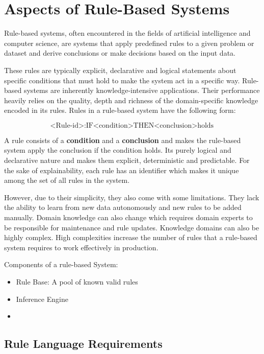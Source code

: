 \chapter{Aspects of Rule-Based Systems}\label{ch:aspects-of-rule-based-systems}

Rule-based systems, often encountered in the fields of artificial intelligence and computer science,
are systems that apply predefined rules to a given problem or dataset
and derive conclusions or make decisions based on the input data\cite{grosan2011rule}.

These rules are typically explicit, declarative and logical statements about specific conditions that must hold to make the system act in a specific way.
Rule-based systems are inherently knowledge-intensive applications\cite{hayes1985rule}.
Their performance heavily relies on the quality, depth and richness of the domain-specific knowledge encoded in its rules.
Rules in a rule-based system have the following form:

\[
    \text{<Rule-id>}: \text{IF} \text{<condition>} \text{THEN} \text{<conclusion>} \text{holds}
\]


A rule consists of a \textbf{condition} and a \textbf{conclusion} and makes the rule-based system apply the conclusion if the condition holds.
Its purely logical and declarative nature and makes them explicit, deterministic and predictable.
For the sake of explainability, each rule has an identifier which makes it unique among the set of all rules in the system.

However, due to their simplicity, they also come with some limitations.
They lack the ability to learn from new data autonomously and new rules to be added manually.
Domain knowledge can also change which requires domain experts to be responsible for maintenance and rule updates.
Knowledge domains can also be highly complex.
High complexities increase the number of rules that a rule-based system requires to work effectively in production.


Components of a rule-based System:

\begin{itemize}
    \item Rule Base: A pool of known valid rules
    \item Inference Engine
    \item
\end{itemize}



\section{Rule Language Requirements}

